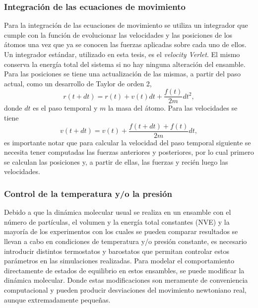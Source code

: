 \subsubsection{Integración de las ecuaciones de movimiento}

Para la integración de las ecuaciones de movimiento se utiliza un integrador que 
cumple con la función de evolucionar las velocidades y las posiciones de los 
átomos una vez que ya se conocen las fuerzas aplicadas sobre cada uno de ellos.
Un integrador estándar, utilizado en esta tesis, es el \textit{velocity Verlet}. 
El mismo conserva la energía total del sistema si no hay ninguna alteración del 
ensamble. Para las posiciones se tiene una actualización de las mismas, a partir
del paso actual, como un desarrollo de Taylor de orden 2,
\begin{equation}
    r(t+dt) = r(t) + v(t) dt + \frac{f(t)}{2m} dt^2,
\end{equation}
donde $dt$ es el paso temporal y $m$ la masa del átomo. Para las velocidades se
tiene
\begin{equation}
    v(t+dt) = v(t) + \frac{f(t+dt)+f(t)}{2m} dt,
\end{equation}
es importante notar que para calcular la velocidad del paso temporal siguiente se
necesita tener computadas las fuerzas anteriores y posteriores, por lo cual
primero se calculan las posiciones y, a partir de ellas, las fuerzas y recién 
luego las velocidades. %


\subsubsection{Control de la temperatura y/o la presión}

Debido a que la dinámica molecular usual se realiza en un ensamble con el número 
de partículas, el volumen y la energía total constantes (NVE) y la mayoría de los
experimentos con los cuales se pueden comparar resultados se llevan a cabo en 
condiciones de temperatura y/o presión constante, es necesario introducir 
distintos termostatos y barostatos que permitan controlar estos parámetros en las 
simulaciones realizadas. Para modelar el comportamiento directamente de estados
de equilibrio en estos ensambles, se puede modificar la dinámica molecular. Donde
estas modificaciones son meramente de conveniencia computacional y pueden producir 
desviaciones del movimiento newtoniano real, aunque extremadamente pequeñas.

